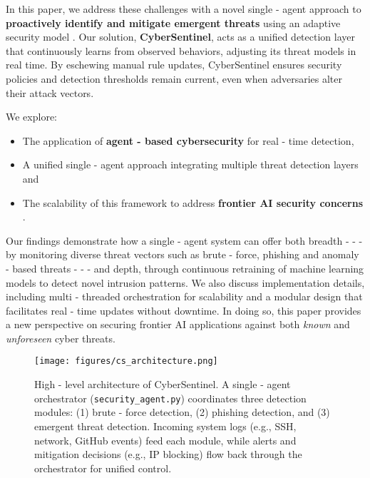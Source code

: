 \documentclass{article}
\begin{document}
In this paper, we address these challenges with a novel single - agent approach to \textbf{proactively identify and mitigate emergent threats} using an adaptive security model \cite{madry2017towards}. Our solution, \textbf{CyberSentinel}, acts as a unified detection layer that continuously learns from observed behaviors, adjusting its threat models in real time. By eschewing manual rule updates, CyberSentinel ensures security policies and detection thresholds remain current, even when adversaries alter their attack vectors.

We explore:
\begin{itemize}
    \item The application of \textbf{agent - based cybersecurity} for real - time detection,
    \item A unified single - agent approach integrating multiple threat detection layers and
    \item The scalability of this framework to address \textbf{frontier AI security concerns} \cite{russell2022human}.
\end{itemize}

Our findings demonstrate how a single - agent system can offer both breadth -  -  - by monitoring diverse threat vectors such as brute - force, phishing and anomaly - based threats -  -  - and depth, through continuous retraining of machine learning models to detect novel intrusion patterns. We also discuss implementation details, including multi - threaded orchestration for scalability and a modular design that facilitates real - time updates without downtime. In doing so, this paper provides a new perspective on securing frontier AI applications against both \emph{known} and \emph{unforeseen} cyber threats.

\begin{figure}[ht]
  \centering
  \texttt{[image: figures/cs\_architecture.png]}
  \caption{High - level architecture of CyberSentinel. A single - agent orchestrator 
    (\texttt{security\_agent.py}) coordinates three detection modules: 
    (1) brute - force detection, 
    (2) phishing detection, 
    and (3) emergent threat detection. 
    Incoming system logs (e.g., SSH, network, GitHub events) feed each module, 
    while alerts and mitigation decisions (e.g., IP blocking) flow back through 
    the orchestrator for unified control.}
  \label{fig:cs - architecture}
\end{figure}
\end{document}
